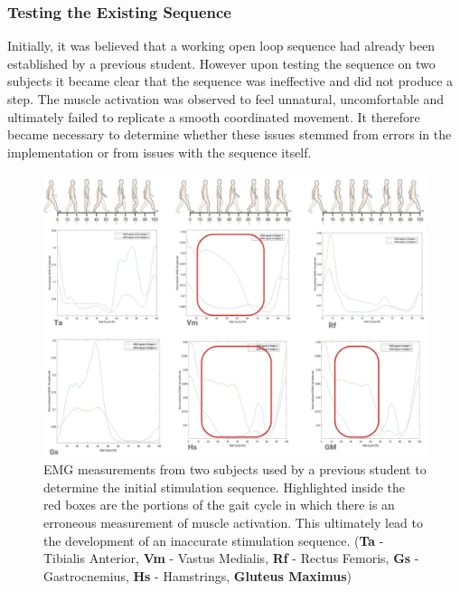 \subsubsection{Testing the Existing Sequence}
Initially, it was believed that a working open loop sequence had already been established by a previous student. However upon testing the sequence on two  subjects it became clear that the sequence was ineffective and did not produce a step. The muscle activation was observed to feel unnatural, uncomfortable and ultimately failed to replicate a smooth coordinated movement. It therefore became necessary to determine whether these issues stemmed from errors in the implementation or from issues with the sequence itself.

\begin{figure} [h]
    \centering
    \includegraphics[width=0.99\linewidth]{images/wrongemg.png}

    \caption{EMG measurements from two subjects used by a previous student to determine the initial stimulation sequence. Highlighted inside the red boxes are the portions of the gait cycle in which there is an erroneous measurement of muscle activation. This ultimately lead to the development of an inaccurate stimulation sequence. (\textbf{Ta} - Tibialis Anterior, \textbf{Vm} - Vastus Medialis, \textbf{Rf} - Rectus Femoris, \textbf{Gs} - Gastrocnemius, \textbf{Hs} - Hamstrings, \textbf{Gluteus Maximus})}
    \label{fig:wrongemg}
\end{figure}

